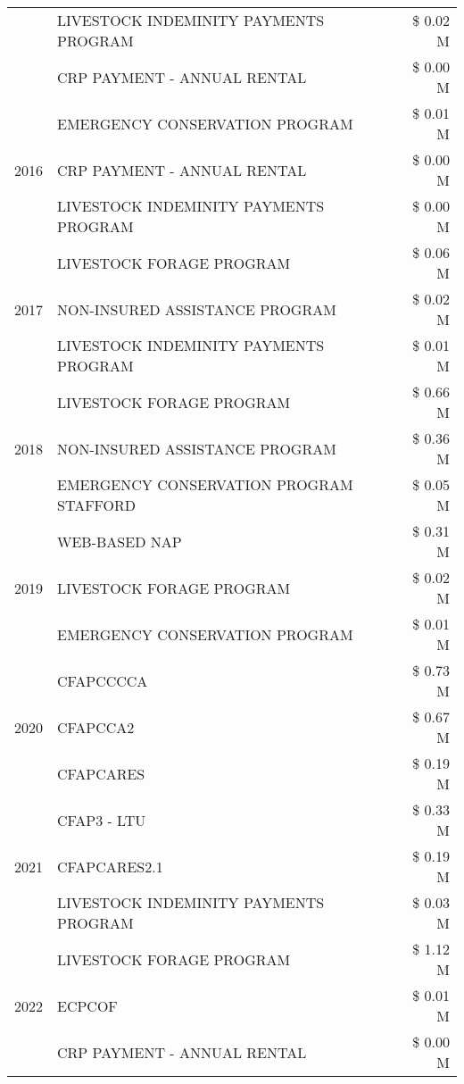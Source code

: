 \begin{tabular}{llr}
 & LIVESTOCK INDEMINITY PAYMENTS PROGRAM & \$ 0.02 M \\
 & CRP PAYMENT - ANNUAL RENTAL & \$ 0.00 M \\
\cline{1-3}
\multirow[t]{3}{*}{2016} & EMERGENCY CONSERVATION PROGRAM & \$ 0.01 M \\
 & CRP PAYMENT - ANNUAL RENTAL & \$ 0.00 M \\
 & LIVESTOCK INDEMINITY PAYMENTS PROGRAM & \$ 0.00 M \\
\cline{1-3}
\multirow[t]{3}{*}{2017} & LIVESTOCK FORAGE PROGRAM & \$ 0.06 M \\
 & NON-INSURED ASSISTANCE PROGRAM & \$ 0.02 M \\
 & LIVESTOCK INDEMINITY PAYMENTS PROGRAM & \$ 0.01 M \\
\cline{1-3}
\multirow[t]{3}{*}{2018} & LIVESTOCK FORAGE PROGRAM & \$ 0.66 M \\
 & NON-INSURED ASSISTANCE PROGRAM & \$ 0.36 M \\
 & EMERGENCY CONSERVATION PROGRAM STAFFORD & \$ 0.05 M \\
\cline{1-3}
\multirow[t]{3}{*}{2019} & WEB-BASED NAP & \$ 0.31 M \\
 & LIVESTOCK FORAGE PROGRAM & \$ 0.02 M \\
 & EMERGENCY CONSERVATION PROGRAM & \$ 0.01 M \\
\cline{1-3}
\multirow[t]{3}{*}{2020} & CFAPCCCCA & \$ 0.73 M \\
 & CFAPCCA2 & \$ 0.67 M \\
 & CFAPCARES & \$ 0.19 M \\
\cline{1-3}
\multirow[t]{3}{*}{2021} & CFAP3 - LTU & \$ 0.33 M \\
 & CFAPCARES2.1 & \$ 0.19 M \\
 & LIVESTOCK INDEMINITY PAYMENTS PROGRAM & \$ 0.03 M \\
\cline{1-3}
\multirow[t]{3}{*}{2022} & LIVESTOCK FORAGE PROGRAM & \$ 1.12 M \\
 & ECPCOF & \$ 0.01 M \\
 & CRP PAYMENT - ANNUAL RENTAL & \$ 0.00 M \\
\cline{1-3}
\bottomrule
\end{tabular}

